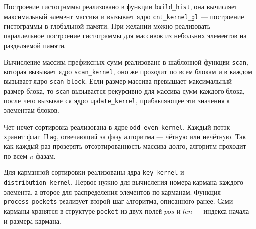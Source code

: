 Построение гистограммы реализовано в функции \texttt{build\_hist}, она вычисляет максимальный элемент массива и вызывает ядро \texttt{cnt\_kernel\_gl} --- построение гистограммы в глобальной памяти. При желании можно реализовать параллельное построение гистограммы для массивов из небольних элементов на разделяемой памяти.

Вычисление массива префиксных сумм реализовано в шаблонной функции \texttt{scan}, которая вызывает ядро \texttt{scan\_kernel}, оно же проходит по всем блокам и в каждом вызывает ядро \texttt{scan\_block}. Если размер массива превышает максимальный размер блока, то \texttt{scan} вызывается рекурсивно для массива сумм каждого блока, после чего вызывается ядро \texttt{update\_kernel}, прибавляющее эти значения к элементам блоков.

Чет-нечет сортировка реализована в ядре \texttt{odd\_even\_kernel}. Каждый поток хранит флаг \texttt{flag}, отвечающий за фазу алгоритма --- чётную или нечётную. Так как каждый раз проверять отсортированность массива долго, алгоритм проходит по всем $n$ фазам.

Для карманной сортировки реализованы ядра \texttt{key\_kernel} и \texttt{distribution\_kernel}. Первое нужно для вычисления номера кармана каждого элемента, а второе для распределения элементов по карманам. Функция \texttt{process\_pockets} реализует второй шаг алгоритма, описанного ранее. Сами карманы хранятся в структуре \texttt{pocket} из двух полей $pos$ и $len$ --- индекса начала и размера кармана.
